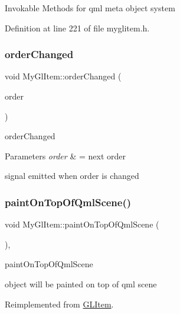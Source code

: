Invokable Methods for qml meta object system 

Definition at line 221 of file myglitem.\+h.

\mbox{\label{class_my_gl_item_a84b6d3045448453a2aaa40703448e132}} 
\subsubsection{\texorpdfstring{orderChanged}{orderChanged}}
{\footnotesize\ttfamily void My\+Gl\+Item\+::order\+Changed (\begin{DoxyParamCaption}\item[{Q\+List$<$ Q\+String $>$}]{order }\end{DoxyParamCaption})\hspace{0.3cm}{\ttfamily [signal]}}



order\+Changed 


\begin{DoxyParams}{Parameters}
{\em order} & = next order\\
\hline
\end{DoxyParams}
signal emitted when order is changed \mbox{\label{class_my_gl_item_ad9f060b5a805367e0fbf065e9318c0b1}} 
\subsubsection{\texorpdfstring{paintOnTopOfQmlScene()}{paintOnTopOfQmlScene()}}
{\footnotesize\ttfamily void My\+Gl\+Item\+::paint\+On\+Top\+Of\+Qml\+Scene (\begin{DoxyParamCaption}{ }\end{DoxyParamCaption})\hspace{0.3cm}{\ttfamily [override]}, {\ttfamily [virtual]}}



paint\+On\+Top\+Of\+Qml\+Scene 

object will be painted on top of qml scene 

Reimplemented from \mbox{\hyperlink{class_g_l_item_a595830cf6ae5434a253c68366275b65d}{G\+L\+Item}}.




